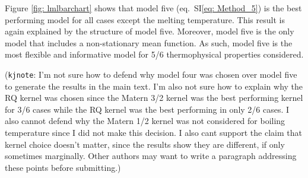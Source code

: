 \documentclass[journal=jacsat,manuscript=article]{achemso}
\newcommand{\kjnote}[1]{{\color{Blue} (\texttt{kjnote}: #1)}}
\newcommand{\siref}[1]{SI\eqref{#1}}
\begin{document}
Figure \ref{fig: lmlbarchart} shows that model five (eq.~\siref{eq: Method_5}) is the best performing model for all cases except the melting temperature. This result is again explained by the structure of model five. Moreover, model five is the only model that includes a non-stationary mean function. As such, model five is the most flexible and informative model for 5/6 thermophysical properties considered.

\kjnote{I'm not sure how to defend why model four was chosen over model five to generate the results in the main text. I'm also not sure how to explain why the RQ kernel was chosen since the Matern 3/2 kernel was the best performing kernel for 3/6 cases while the RQ kernel was the best performing in only 2/6 cases. I also cannot defend why the Matern 1/2 kernel was not considered for boiling temperature since I did not make this decision. I also cant support the claim that kernel choice doesn't matter, since the results show they are different, if only sometimes marginally. Other authors may want to write a paragraph addressing these points before submitting.}
\end{document}
